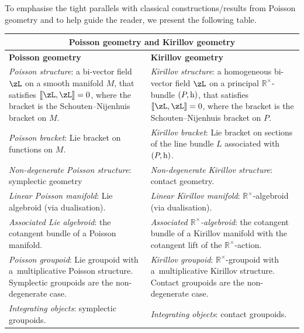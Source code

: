 \documentclass[pdftex]{sigma}
\newcommand{\Dleft}{[\hspace{-1.5pt}[}
\newcommand{\Dright}{]\hspace{-1.5pt}]}
\newcommand{\SN}[1]{\Dleft #1 \Dright}
\newcommand{\rmh}{\textnormal{h}}
\newcommand{\R}{{\mathbb R}}
\newcommand{\ti}{\times}
\numberwithin{equation}{section}
\begin{document}
To emphasise the tight parallels with classical constructions/results from Poisson geometry and to help guide the reader, we present the following table.


\begin{table}[h!]\centering\renewcommand{\arraystretch}{1.25}
\begin{tabular}{ |p{7cm}||p{7cm}| }
 \hline
 \multicolumn{2}{|c|}{Poisson geometry and Kirillov geometry} \\
 \hline
 \textbf{Poisson geometry} & \textbf{Kirillov geometry} \\
 \hline
\emph{Poisson structure}: a bi-vector f\/ield $\zL$ on a smooth manifold $M$, that satisf\/ies $\SN{\zL, \zL} =0$, where the bracket is the Schouten--Nijenhuis bracket on $M$. & \emph{Kirillov structure}: a homogeneous bi-vec\-tor f\/ield $\zL$ on a principal $\R^\ti$-bundle $(P, \rmh)$, that satisf\/ies $\SN{\zL, \zL} =0$, where the bracket is the Schouten--Nijenhuis bracket on $P$.\\
\hline
\emph{Poisson bracket}: Lie bracket on functions on $M$. & \emph{Kirillov bracket}: Lie bracket on sections of the line bundle $L$ associated with $(P, \rmh)$. \\
\hline
\emph{Non-degenerate Poisson structure}: symplectic geometry & \emph{Non-degenerate Kirillov structure}: contact geometry.\\
\hline
\emph{Linear Poisson manifold}: Lie algebroid (via dualisation). & \emph{Linear Kirillov manifold}: $\R^\ti$-algebroid (via dualisation).\\
\hline
\emph{Associated Lie algebroid}: the cotangent bundle of a Poisson manifold. & \emph{Associated $\R^\ti$-algebroid}: the cotangent bundle of a Kirillov manifold with the cotangent lift of the $\R^\ti$-action.\\
\hline
\emph{Poisson groupoid}: Lie groupoid with a~mul\-ti\-plicative Poisson structure. Symp\-lec\-tic groupoids are the non-degenerate case. & \emph{Kirillov groupoid}: $\R^\ti$-groupoid with a~mul\-tiplicative Kirillov structure. Contact groupoids are the non-degenerate case.\\
\hline
\emph{Integrating objects}: symplectic groupoids. & \emph{Integrating objects}: contact groupoids.\\
\hline
\end{tabular}
\end{table}
\end{document}
